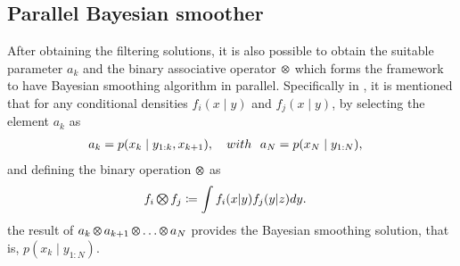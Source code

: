 \documentclass[dissertation,math,vertlayout,pdfa,colorlinks,nologo]{aaltoseries}
\DeclareMathOperator*{\Motimes}{\text{\raisebox{0.25ex}{\scalebox{0.65}{$\bigotimes$}}}}
\begin{document}
        \subsection{Parallel Bayesian smoother}
            After obtaining the filtering solutions, it is also possible to obtain the suitable parameter $a_k$ and the binary associative operator $\Motimes$ which forms the framework to have Bayesian smoothing algorithm in parallel. Specifically in \cite[Definition 4 and Theorem 5]{sarkka2020temporal}, it is mentioned that for any conditional densities $f_i(x \mid y)$ and $f_j(x \mid y)$, by selecting the element $a_k$ as 
            \begin{equation} \label{eq:gen-smoother-init}
                \begin{split} 
                    a_k &= p(x_k \mid y_{1:k}, x_{k+1}), \quad \tiny{with} \quad a_N=p(x_N \mid y_{1:N}),
                \end{split}
            \end{equation}
            and defining the binary operation $\Motimes$ as
            \begin{equation} \label{eq:gen-smoother-comb}
                \begin{split} 
                    f_i &\Motimes f_j \coloneqq \int{f_i(x|y)f_j(y|z)}dy.
                \end{split}
            \end{equation}
            the result of $a_k \Motimes a_{k+1} \Motimes \dots \Motimes a_N$ provides the Bayesian smoothing solution, that is, $p(x_k \mid y_{1:N})$.

        
\end{document}

